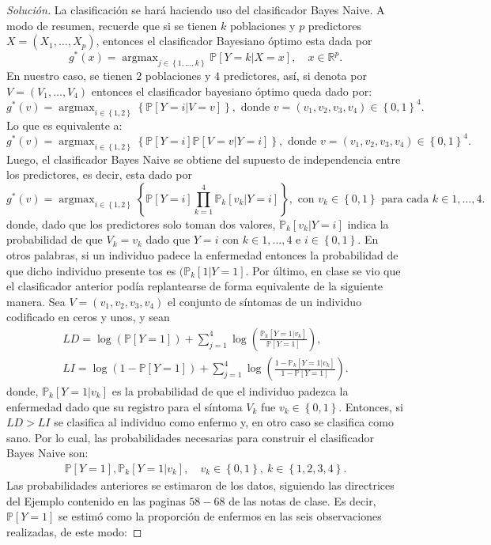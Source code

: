 \documentclass[10.5pt,notitlepage]{article}
\newenvironment{solucion}
  {\begin{proof}[Solución]}
  {\end{proof}}
\DeclareMathOperator{\argmax}{argmax}
\newcommand{\PP}{\mathbb{P}}
\newcommand{\RR}{\mathbb{R}}
\newcommand{\kis}[1]{\left\{ #1 \right\}}
\newcommand{\pare}[1]{\left( #1 \right)}
\theoremstyle{plain}
\begin{document}
\begin{solucion}
La clasificación se hará haciendo uso del clasificador Bayes Naive. A modo de resumen, recuerde que si se tienen \(k\) poblaciones y \(p\) predictores \(X = (X_1, \hdots, X_p)\), entonces el clasificador Bayesiano óptimo esta dada por
\[
g^{*}(x) = \argmax_{j \in \kis{1, \hdots, k}}\PP[Y = k | X = x],  \quad x\in \RR^{p}.
\]
En nuestro caso, se tienen \(2\) poblaciones y \(4\) predictores, así, si denota por \(V = (V_1, \hdots, V_4)\) entonces el clasificador bayesiano óptimo queda dado por: 
\[
g^{*}(v) = \argmax_{i\in\kis{1,2}}\kis{\PP[Y = i | V = v]}, \text{ donde }  v= (v_1,v_2,v_3,v_4)\in \kis{0,1}^{4}. 
\]
Lo que es equivalente a:
\[
g^{*}(v) = \argmax_{i\in\kis{1,2}}\kis{\PP[Y=i]\PP[V = v | Y = i]}, \text{ donde }  v= (v_1,v_2,v_3,v_4)\in \kis{0,1}^{4}. 
\] 
Luego, el clasificador Bayes Naive se obtiene del supuesto de independencia entre los predictores, es decir, esta dado por 
\[
g^{*}(v) = \argmax_{i\in\kis{1,2}}\kis{\PP[Y=i]\prod_{k=1}^{4}\PP_{k}[v_k| Y = i]}, \text{ con } v_k \in \kis{0,1} \text{ para cada } k\in{1, \hdots, 4}. 
\]
donde, dado que los predictores solo toman dos valores, \(\PP_{k}[v_k| Y = i]\) indica la probabilidad de que \(V_k = v_k\) dado que \(Y= i\) con \(k\in{1, \hdots, 4}\) e \(i \in \kis{0,1}\). En otros palabras, si un individuo padece la enfermedad entonces la probabilidad de que dicho individuo presente tos es \((\PP_{k}[1| Y = 1]\). Por último, en clase se vio que el clasificador anterior podía replantearse de forma equivalente de la siguiente manera. Sea \(V = (v_1, v_2, v_3, v_4)\) el conjunto de síntomas de un individuo codificado en ceros y unos, y sean 
\begin{align}
    LD = \log(\PP[Y = 1]) + \sum_{ j = 1}^{4}\log\pare{\frac{\PP_{k}[Y = 1|v_k]}{\PP[Y = 1]}}, \nonumber\\ 
    LI = \log(1 - \PP[Y = 1]) + \sum_{ j = 1}^{4}\log\pare{\frac{1 - \PP_{k}[Y = 1|v_k]}{1 - \PP[Y = 1]}}. \label{BN.1}
\end{align}
donde, \(\PP_{k}[Y = 1|v_k]\) es la probabilidad de que el individuo padezca la enfermedad dado que su registro para el síntoma \(V_k\) fue \(v_k \in \kis{0,1}\). Entonces, si \(LD > LI\) se clasifica al individuo como enfermo y, en otro caso se clasifica como sano. Por lo cual, las probabilidades necesarias para construir el clasificador Bayes Naive son:
\begin{align*}
     \PP[Y = 1], \PP_{k}[Y = 1 | v_{k}], \quad v_{k}\in\kis{0,1}, \ k\in\kis{1,2,3,4}.
\end{align*}
Las probabilidades anteriores se estimaron de los datos, siguiendo las directrices del Ejemplo contenido en las paginas \(58 - 68\) de las notas de clase. Es decir, \(\PP[Y =1]\) se estimó como la proporción de enfermos en las seis observaciones realizadas, de este modo: 

\end{solucion}
\end{document}
